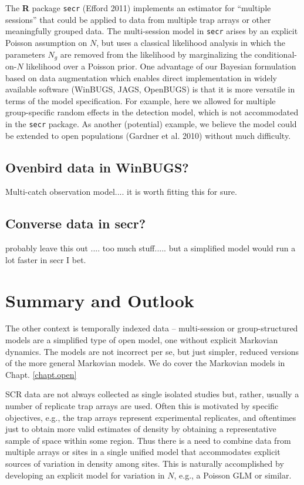 The {\bf R} package \mbox{\tt secr} (Efford 2011) implements an
estimator for ``multiple sessions'' that could be applied to data from
multiple trap arrays or other meaningfully grouped data.
 The multi-session
model in \mbox{\tt secr} 
arises by an explicit Poisson assumption on $N$, but uses
 a classical likelihood analysis in which the parameters $N_{g}$
are removed from the likelihood by marginalizing the
conditional-on-$N$ likelihood over a Poisson prior.  One advantage of
our Bayesian formulation based on data augmentation which enables
direct implementation in widely available software (WinBUGS, JAGS,
OpenBUGS) is that it is more versatile in terms of the model
specification. For example, here we allowed for multiple
group-specific random effects in the detection model, which is not
accommodated in the \mbox{\tt secr}
package. As another (potential) example, we believe the model could be
extended to open populations (Gardner et al. 2010) without much
difficulty.

\subsection{Ovenbird data in WinBUGS?}

Multi-catch observation model.... it is worth fitting this for sure.

\subsection{Converse data in secr?}

probably leave this out .... too much stuff..... but a simplified
model would run a lot faster in secr I bet.  

\section{Summary and Outlook}


The other context is temporally indexed data -- multi-session or
group-structured models are a simplified type of open model, one
without explicit Markovian dynamics. The models are not incorrect per
se, but just simpler, reduced versions of the more general Markovian
models. We do cover the Markovian models in Chapt. \ref{chapt.open}


SCR data are not
always collected as single isolated studies but, rather, usually a number of
replicate trap arrays are used. Often this is motivated by specific
objectives, e.g., the trap arrays represent experimental replicates,
and oftentimes just to obtain more valid estimates of density by
obtaining a representative sample of space within some region.  Thus
there is a need to combine data from multiple arrays or sites in a
single unified model that accommodates explicit sources of variation
in density among sites.  This is naturally accomplished by developing
an explicit model for variation in $N$, e.g., a Poisson GLM or
similar.

